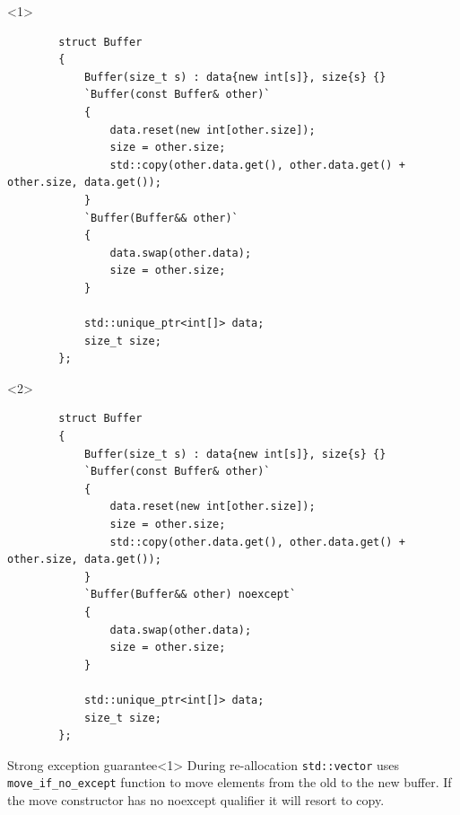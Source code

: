 \documentclass{beamer}
\begin{document}
\begin{frame}[fragile]
    \begin{onlyenv}<1>
    \begin{lstlisting}
        struct Buffer
        {
            Buffer(size_t s) : data{new int[s]}, size{s} {}
            `Buffer(const Buffer& other)`
            {
                data.reset(new int[other.size]);
                size = other.size;
                std::copy(other.data.get(), other.data.get() + other.size, data.get());
            }
            `Buffer(Buffer&& other)`
            {
                data.swap(other.data);
                size = other.size;
            }

            std::unique_ptr<int[]> data;
            size_t size;
        };
    \end{lstlisting}
    \end{onlyenv}
    \begin{onlyenv}<2>
    \begin{lstlisting}
        struct Buffer
        {
            Buffer(size_t s) : data{new int[s]}, size{s} {}
            `Buffer(const Buffer& other)`
            {
                data.reset(new int[other.size]);
                size = other.size;
                std::copy(other.data.get(), other.data.get() + other.size, data.get());
            }
            `Buffer(Buffer&& other) noexcept`
            {
                data.swap(other.data);
                size = other.size;
            }

            std::unique_ptr<int[]> data;
            size_t size;
        };
    \end{lstlisting}
    \end{onlyenv}
    \begin{alertblock}{Strong exception guarantee}<1>
        During re-allocation \texttt{std::vector} uses \texttt{move\_if\_no\_except} function to move
        elements from the old to the new buffer.
        If the move constructor has no noexcept qualifier it will resort to copy.
    \end{alertblock}
\end{frame}
\end{document}
